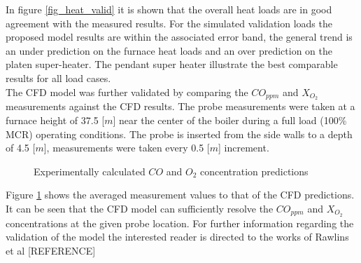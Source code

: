 \documentclass[review]{elsarticle}
\begin{document}
In figure \ref{fig_heat_valid} it is shown that the overall heat loads are in good agreement with the measured results. For the simulated validation loads the proposed model results are within the associated error band, the general trend is an under prediction on the furnace heat loads and an over prediction on the platen super-heater. The pendant super heater illustrate the best comparable results for all load cases.\\

The CFD model was further validated by comparing the $CO_{ppm}$ and $X_{O_{2}}$ measurements against the CFD results. The probe measurements were taken at a furnace height of 37.5 [$m$] near the center of the boiler during a full load (100\% MCR) operating conditions. The probe is inserted from the side walls to a depth of 4.5 [$m$], measurements were taken every 0.5 [$m$] increment.\\
\begin{figure}[h!]\label{fig_probe_valid}
\centering
{}
\hspace{5mm}
\caption{Experimentally calculated $CO$ and $O_2$ concentration predictions}
\end{figure}

Figure \ref{fig_probe_valid} shows the averaged measurement values to that of the CFD predictions. It can be seen that the CFD model can sufficiently resolve the $CO_{ppm}$ and $X_{O_{2}}$ concentrations at the given probe location. For further information regarding the validation of the model the interested reader is directed to the works of Rawlins et al [REFERENCE]
\end{document}
